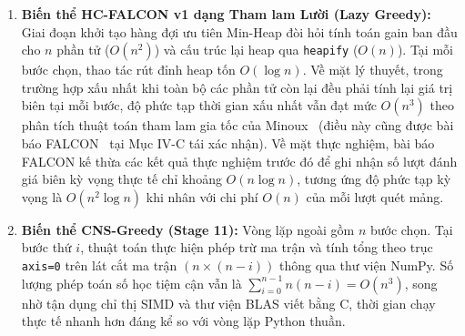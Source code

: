 \begin{enumerate}
    \item \textbf{Biến thể HC-FALCON v1 dạng Tham lam Lười (Lazy Greedy):}
    Giai đoạn khởi tạo hàng đợi ưu tiên Min-Heap đòi hỏi tính toán gain ban đầu cho $n$ phần tử ($O(n^2)$) và cấu trúc lại heap qua \texttt{heapify} ($O(n)$). Tại mỗi bước chọn, thao tác rút đỉnh heap tốn $O(\log n)$. Về mặt lý thuyết, trong trường hợp xấu nhất khi toàn bộ các phần tử còn lại đều phải tính lại giá trị biên tại mỗi bước, độ phức tạp thời gian xấu nhất vẫn đạt mức $O(n^3)$ theo phân tích thuật toán tham lam gia tốc của Minoux~\cite{minoux1978accelerated} (điều này cũng được bài báo FALCON~\cite{falcon2026} tại Mục IV-C tái xác nhận). Về mặt thực nghiệm, bài báo FALCON kế thừa các kết quả thực nghiệm trước đó để ghi nhận số lượt đánh giá biên kỳ vọng thực tế chỉ khoảng $O(n \log n)$, tương ứng độ phức tạp kỳ vọng là $O(n^2 \log n)$ khi nhân với chi phí $O(n)$ của mỗi lượt quét mảng.
    
    \item \textbf{Biến thể CNS-Greedy (Stage 11):}
    Vòng lặp ngoài gồm $n$ bước chọn. Tại bước thứ $i$, thuật toán thực hiện phép trừ ma trận và tính tổng theo trục \texttt{axis=0} trên lát cắt ma trận $(n \times (n - i))$ thông qua thư viện NumPy. Số lượng phép toán số học tiệm cận vẫn là $\sum_{i=0}^{n-1} n (n - i) = O(n^3)$, song nhờ tận dụng chỉ thị SIMD và thư viện BLAS viết bằng C, thời gian chạy thực tế nhanh hơn đáng kể so với vòng lặp Python thuần.
    

\end{enumerate}
